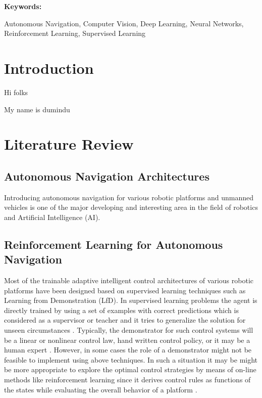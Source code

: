 \documentclass[a4paper,oneside,12pt]{report}
\begin{document}
\textbf{Keywords:}

 Autonomous Navigation, Computer Vision, Deep Learning, Neural Networks,
 Reinforcement Learning, Supervised Learning


\setlength{\parindent}{5mm}
\normalsize
{}

\tableofcontents
{}
\clearpage


\clearpage



\setlength{\parindent}{5mm}
\normalsize
{}
\chapter{Introduction}
\label{ch:introduction}

Hi folks 

My name is dumindu

\chapter{Literature Review}
\label{ch:litearure review}

\section{Autonomous Navigation Architectures}

Introducing autonomous navigation for various robotic platforms and unmanned vehicles is one of the major developing and interesting area in the field of robotics and Artificial Intelligence (AI). 

\section{Reinforcement Learning for Autonomous Navigation}
Most of the trainable adaptive intelligent control architectures of various robotic platforms have been designed based on supervised learning techniques such as Learning from Demonstration (LfD)\cite{R38}. In supervised learning problems the agent is directly trained by using a set of examples with correct predictions which is considered as a supervisor or teacher and it tries to generalize the solution for unseen circumstances \cite{R03}. Typically, the demonstrator for such control systems will be a linear or nonlinear control law, hand written control policy, or it may be a human expert \cite{R05} \cite{R23}.  However, in some cases the role of a demonstrator might not be feasible to implement using above techniques. In such a situation it may be might be more appropriate to explore the optimal control strategies by means of on-line methods like reinforcement learning since it derives control rules as functions of the states while evaluating the overall behavior of a platform \cite{R38}.
\end{document}
